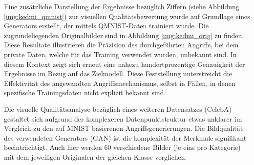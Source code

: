 Eine zusätzliche Darstellung der Ergebnisse bezüglich Ziffern (siehe Abbildung \ref{img:kedmi_qmnist}) zur visuellen Qualitätsbewertung wurde auf Grundlage eines Generators erstellt, der mittels QMNIST-Daten trainiert wurde. Die zugrundeliegenden Originalbilder sind in Abbildung \ref{img:kedmi_orig} zu finden. Diese Resultate illustrieren die Präzision des durchgeführten Angriffs, bei dem private Daten, welche für das Training verwendet wurden, unbekannt sind. In diesem Kontext zeigt sich erneut eine nahezu hundertprozentige Genauigkeit der Ergebnisse im Bezug auf das Zielmodell. Diese Feststellung unterstreicht die Effektivität des angewandten Angriffsmechanismus, selbst in Fällen, in denen spezifische Trainingsdaten nicht explizit bekannt sind.

Die visuelle Qualitätsanalyse bezüglich eines weiteren Datensatzes (CelebA) gestaltet sich aufgrund der komplexeren Datenpunktstruktur etwas unklarer im Vergleich zu den auf MNIST basierenen Angriffsgenerierungen. Die Bildqualität des verwendeten Generators (GAN) ist die komplexität der Merkmale signifikant beeinträchtigt. Auch hier werden 60 verschiedene Bilder (je eins pro Kategorie) mit dem jeweiligen Originalen der gleichen Klasse verglichen.

